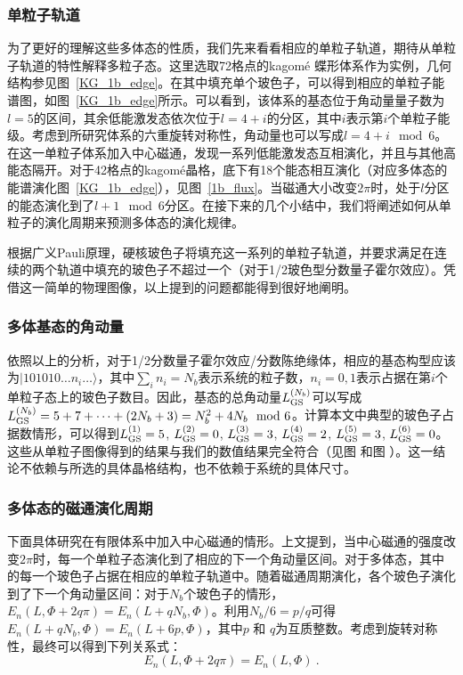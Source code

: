 \subsubsection{单粒子轨道}
为了更好的理解这些多体态的性质，我们先来看看相应的单粒子轨道，期待从单粒子轨道的特性解释多粒子态。这里选取72格点的kagom\'{e} 蝶形体系作为实例，几何结构参见图~\ref{KG_1b_edge}。在其中填充单个玻色子，可以得到相应的单粒子能谱图，如图~\ref{KG_1b_edge}所示。可以看到，该体系的基态位于角动量量子数为$l = 5$的区间，其余低能激发态依次位于$l = 4 + i$的分区，其中$i$表示第$i$个单粒子能级。考虑到所研究体系的六重旋转对称性，角动量也可以写成$l = 4 + i \mod 6$。在这一单粒子体系加入中心磁通，发现一系列低能激发态互相演化，并且与其他高能态隔开。对于42格点的kagom\'{e}晶格，底下有18个能态相互演化（对应多体态的能谱演化图~\ref{KG_1b_edge}），见图~\ref{1b_flux}。当磁通大小改变$2\pi$时，处于$l$分区的能态演化到了$l+1 \mod 6$分区。在接下来的几个小结中，我们将阐述如何从单粒子的演化周期来预测多体态的演化规律。

根据广义Pauli原理，硬核玻色子将填充这一系列的单粒子轨道，并要求满足在连续的两个轨道中填充的玻色子不超过一个（对于1/2玻色型分数量子霍尔效应）。凭借这一简单的物理图像，以上提到的问题都能得到很好地阐明。


\subsubsection{多体基态的角动量}
依照以上的分析，对于1/2分数量子霍尔效应/分数陈绝缘体，相应的基态构型应该为$|101010 \ldots n_i \ldots \rangle$，其中$\sum_i n_i =
N_b $表示系统的粒子数，$n_i = 0, 1$表示占据在第$i$个单粒子态上的玻色子数目。因此，基态的总角动量$L_{\rm GS}^{(N_b)}$可以写成$L_{\rm GS}^{(N_b)} = 5+7+\dots+(2N_b+3) = N_b^2 + 4N_b \mod 6$。计算本文中典型的玻色子占据数情形，可以得到$L_{\rm GS}^{(1)} = 5$, $L_{\rm GS}^{(2)} = 0$, $L_{\rm GS}^{(3)} = 3$, $L_{\rm GS}^{(4)} = 2$, $L_{\rm GS}^{(5)} = 3$, $L_{\rm GS}^{(6)} = 0$。这些从单粒子图像得到的结果与我们的数值结果完全符合（见图 和图 ）。这一结论不依赖与所选的具体晶格结构，也不依赖于系统的具体尺寸。


\subsubsection{多体态的磁通演化周期}
下面具体研究在有限体系中加入中心磁通的情形。上文提到，当中心磁通的强度改变$2\pi$时，每一个单粒子态演化到了相应的下一个角动量区间。对于多体态，其中的每一个玻色子占据在相应的单粒子轨道中。随着磁通周期演化，各个玻色子演化到了下一个角动量区间：对于$N_b$个玻色子的情形，$E_n(L,\Phi+2q\pi)=E_n(L+qN_b,\Phi)$。利用$N_b/6=p/q$可得$E_n(L+qN_b,\Phi)=E_n(L+6p,\Phi)$，其中$p$ 和 $q$为互质整数。考虑到旋转对称性，最终可以得到下列关系式：
\[E_n(L,\Phi+2q\pi)=E_n(L,\Phi)~.\]


